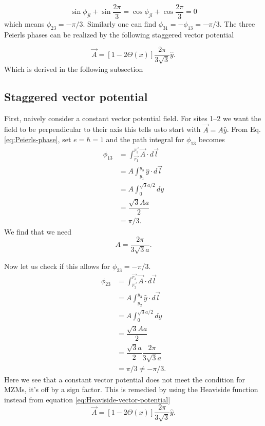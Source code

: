 \begin{equation}
  \sin\phi_{jl} + \sin\dfrac{2\pi}{3} = \cos\phi_{jl} + \cos\dfrac{2\pi}{3} = 0
\end{equation}
which means $\phi_{23} = -\pi/3$.
Similarly one can find $\phi_{31} = -\phi_{13} = -\pi/3$.
The three Peierls phases can be realized by the following staggered vector potential

\begin{equation}\label{eq:Heaviside-vector-potential}
  \vec{A} = [1-2\Theta(x)] \dfrac{2\pi}{3\sqrt{3}}\hat{y}.
\end{equation}
Which is derived in the following subsection

\subsection{Staggered vector potential}

First, naively consider a constant vector potential field.
For sites 1--2 we want the field to be perpendicular to their axis this tells usto start with $\vec{A} = A\hat{y}$.
From Eq. \ref{eq:Peierls-phase}, set $e=\hbar=1$ and the path integral for $\phi_{13}$ becomes
\begin{align}
  \phi_{13} &= \int_{\vec{r_1}}^{\vec{r_3}} \vec{A} \cdot d\vec{l} \nonumber \\
  &= A \int_{y_1}^{y_3} \hat{y} \cdot d\vec{l} \nonumber \\
  &= A \int_0^{\sqrt{3}a/2} dy \nonumber \\
  &= \dfrac{\sqrt{3} A a}{2} \nonumber \\
  &= \pi/3. \nonumber
\end{align}
We find that we need
\begin{equation} \label{constant vector potential magnitude}
  A = \dfrac{2 \pi}{3 \sqrt{3} a}.
\end{equation}

Now let us check if this allows for $\phi_{23} = -\pi/3$.
\begin{align}
  \phi_{23} &= \int_{\vec{r_2}}^{\vec{r_3}} \vec{A} \cdot d\vec{l} \nonumber \\
  &= A \int_{y_2}^{y_3} \hat{y} \cdot d\vec{l} \nonumber \\
  &= A \int^{\sqrt{3}a/2}_0 dy \nonumber \\
  &= \dfrac{\sqrt{3} A a}{2} \nonumber \\
  &= \dfrac{\sqrt{3} a}{2} \dfrac{2 \pi}{3 \sqrt{3} a} \nonumber \\
  &= \pi/3 \neq -\pi/3. \nonumber
\end{align}
Here we see that a constant vector potential does not meet the condition for MZMs, it's off by a sign factor.
This is remedied by using the Heaviside function instead from equation \ref{eq:Heaviside-vector-potential}
\begin{equation}
  \vec{A} = [1-2\Theta(x)] \dfrac{2\pi}{3\sqrt{3}}\hat{y}. \nonumber
\end{equation}

